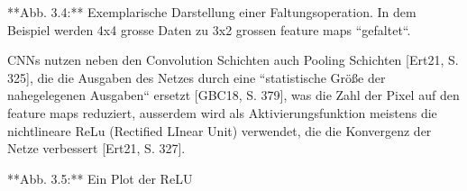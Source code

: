 **Abb. 3.4:** Exemplarische Darstellung einer Faltungsoperation. In dem Beispiel werden 4x4 grosse Daten zu 3x2 grossen feature maps ``gefaltet``.

CNNs nutzen neben den Convolution Schichten auch Pooling Schichten [Ert21, S. 325], die die Ausgaben des Netzes durch eine ``statistische Größe der nahegelegenen Ausgaben`` ersetzt [GBC18, S. 379], was die Zahl der Pixel auf den feature maps reduziert\footnotemark[45], ausserdem wird als Aktivierungsfunktion meistens die nichtlineare ReLu (Rectified LInear Unit) verwendet, die die Konvergenz der Netze verbessert [Ert21, S. 327].

**Abb. 3.5:** Ein Plot der ReLU




